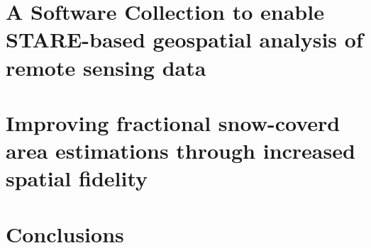 \documentclass[oneside,11pt,final]{sty/ucthesis-CA2012}
\begin{document}
\begin{mainmatter}
\chapter{A Software Collection to enable STARE-based geospatial analysis of remote sensing data}
\label{Chapter_Software}
\glsresetall


\chapter{Improving fractional snow-coverd area estimations through increased spatial fidelity}
\label{chapter_3}
\glsresetall


\chapter{Conclusions}
\label{chapter_4}
\glsresetall






\end{mainmatter}

\ssp
%
%
\printbibliography
\end{document}
